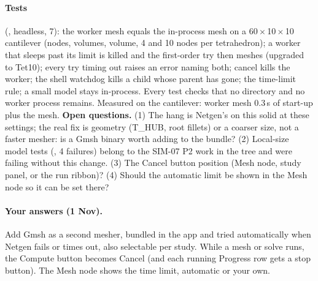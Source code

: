 \paragraph{Tests} (, headless, 7): the worker mesh equals the in-process mesh on a
60\,$\times$\,10\,$\times$\,10 cantilever (nodes, volumes, volume, 4 and 10 nodes per tetrahedron); a worker that sleeps past
its limit is killed and the first-order try then meshes (upgraded to Tet10); every try timing out raises an error naming both;
cancel kills the worker; the shell watchdog kills a child whose parent has gone; the time-limit rule; a small model stays
in-process. Every test checks that no  directory and no worker process remains. Measured on the cantilever:
worker mesh 0.3\,s of start-up plus the mesh. \textbf{Open questions.} (1) The hang is Netgen's on this solid at these
settings; the real fix is geometry (T\_HUB, root fillets) or a coarser size, not a faster mesher: is a Gmsh binary worth
adding to the bundle? (2) Local-size model tests (, 4 failures) belong to the SIM-07 P2 work in the tree and were failing without this change. (3) The Cancel button position (Mesh node, study panel, or the run ribbon)? (4) Should the automatic
limit be shown in the Mesh node so it can be set there?

\paragraph{Your answers (1 Nov).} Add Gmsh as a second mesher, bundled in the app and tried automatically when Netgen
fails or times out, also selectable per study. While a mesh or solve runs, the Compute button becomes Cancel (and each
running Progress row gets a stop button). The Mesh node shows the time limit, automatic or your own.

